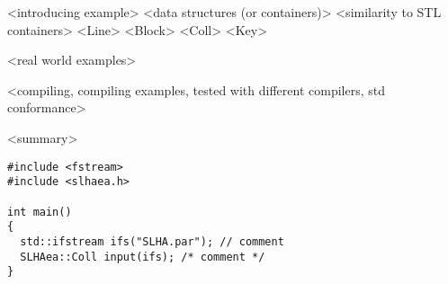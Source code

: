 \documentclass[
  11pt,
  ]{revtex4-1}
\begin{document}
<introducing example>
<data structures (or containers)>
 <similarity to STL containers>
 <Line>
 <Block>
 <Coll>
 <Key>

<real world examples>

<compiling, compiling examples, tested with different compilers,
std conformance>

<summary>

\begin{lstlisting}
#include <fstream>
#include <slhaea.h>

int main()
{
  std::ifstream ifs("SLHA.par"); // comment
  SLHAea::Coll input(ifs); /* comment */
}
\end{lstlisting}




\nocite{*}
\end{document}
